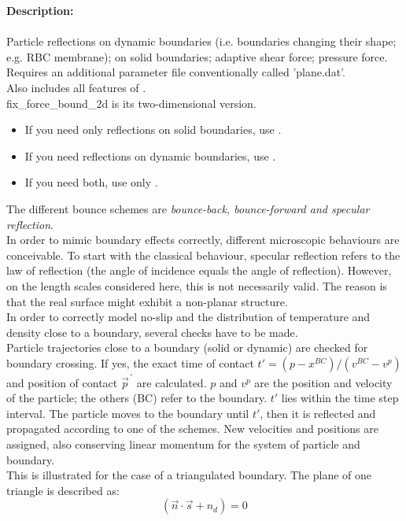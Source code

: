 \textbf{Description:}\\ \\
Particle reflections on dynamic boundaries (i.e. boundaries changing their shape; e.g. RBC membrane); on solid boundaries; adaptive shear force; pressure force.\\Requires an additional parameter file conventionally called 'plane.dat'.\\Also includes all features of .\\fix\_force\_bound\_2d is its two-dimensional version.
\begin{itemize}
\item If you need only reflections on solid boundaries, use .
\item If you need reflections on dynamic boundaries, use .
\item If you need both, use only .
\end{itemize}
The different bounce schemes are \textit{bounce-back, bounce-forward and specular reflection}.\\In order to mimic boundary effects correctly, different microscopic behaviours are conceivable. To start with the classical behaviour, specular reflection refers to the law of reflection (the angle of incidence equals the angle of reflection). However, on the length scales considered here, this is not necessarily valid. The reason is that the real surface might exhibit a non-planar structure.\\In order to correctly model no-slip and the distribution of temperature and density close to a boundary, several checks have to be made.\\Particle trajectories close to a boundary (solid or dynamic) are checked for boundary crossing. If yes, the exact time of contact $t'=\left(p-x^{BC}\right)/\left(v^{BC}-v^p\right)$ and position of contact $\vec{p}^{\,'}$ are calculated. $p$ and $v^p$ are the position and velocity of the particle; the others (BC) refer to the boundary. $t'$ lies within the time step interval. The particle moves to the boundary until $t'$, then it is reflected and propagated according to one of the schemes. New velocities and positions are assigned, also conserving linear momentum for the system of particle and boundary.\\This is illustrated for the case of a triangulated boundary. The plane of one triangle is described as:
\begin{equation}
\left(\vec{n} \cdot \vec{s} + n_d \right) = 0
\end{equation}
